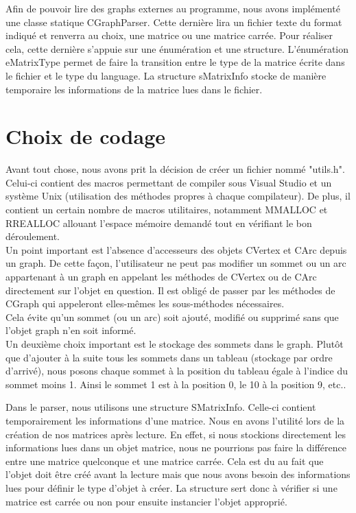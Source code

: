 		Afin de pouvoir lire des graphs externes au programme, nous avons implémenté une classe statique CGraphParser. Cette dernière lira un fichier texte du format indiqué et renverra au choix, une matrice ou une matrice carrée. Pour réaliser cela, cette dernière s'appuie sur une énumération et une structure. L'énumération eMatrixType permet de faire la transition entre le type de la matrice écrite dans le fichier et le type du language. La structure sMatrixInfo stocke de manière temporaire les informations de la matrice lues dans le fichier. 
		
		
	\chapter{Choix de codage}
		Avant tout chose, nous avons prit la décision de créer un fichier nommé "utils.h". Celui-ci contient des macros permettant de compiler sous Visual Studio et un système Unix (utilisation des méthodes propres à chaque compilateur). De plus, il contient un certain nombre de macros utilitaires, notamment MMALLOC et RREALLOC allouant l'espace mémoire demandé tout en vérifiant le bon déroulement.\\
	
		Un point important est l'absence d'accesseurs des objets CVertex et CArc depuis un graph. De cette façon, l'utilisateur ne peut pas modifier un sommet ou un arc appartenant à un graph en appelant les méthodes de CVertex ou de CArc directement sur l'objet en question. Il est obligé de passer par les méthodes de CGraph qui appeleront elles-mêmes les sous-méthodes nécessaires.\\
		Cela évite qu'un sommet (ou un arc) soit ajouté, modifié ou supprimé sans que l'objet graph n'en soit informé.\\
		
		Un deuxième choix important est le stockage des sommets dans le graph. Plutôt que d'ajouter à la suite tous les sommets dans un tableau (stockage par ordre d'arrivé), nous posons chaque sommet à la position du tableau égale à l'indice du sommet moins 1. Ainsi le sommet 1 est à la position 0, le 10 à la position 9, etc..
		
	
		Dans le parser, nous utilisons une structure SMatrixInfo. Celle-ci contient temporairement les informations d'une matrice. Nous en avons l'utilité lors de la création de nos matrices après lecture. En effet, si nous stockions directement les informations lues dans un objet matrice, nous ne pourrions pas faire la différence entre une matrice quelconque et une matrice carrée. Cela est du au fait que l'objet doit être créé avant la lecture mais que nous avons besoin des informations lues pour définir le type d'objet à créer. La structure sert donc à vérifier si une matrice est carrée ou non pour ensuite instancier l'objet approprié.
	

